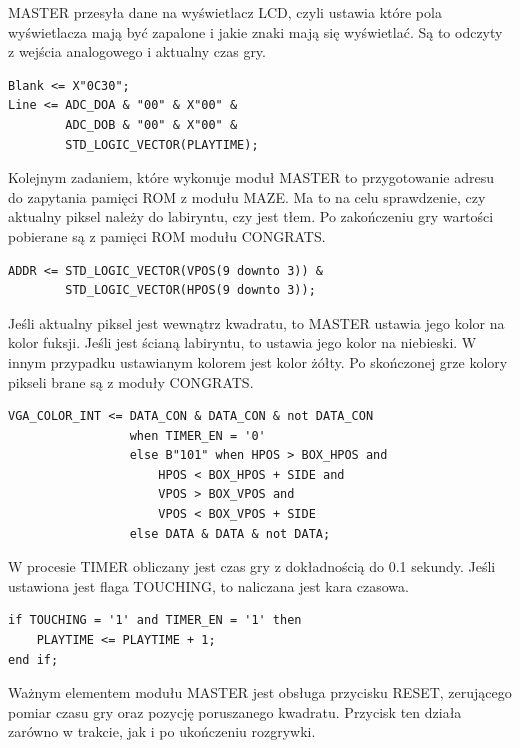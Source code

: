 \documentclass[11pt]{article}
\begin{document}
MASTER przesyła dane na wyświetlacz LCD, czyli ustawia które pola wyświetlacza mają być zapalone i jakie znaki mają się wyświetlać.
Są to odczyty z wejścia analogowego i aktualny czas gry.

\begin{lstlisting}[caption=Sterowanie wyświetlaczem LCD]
Blank <= X"0C30";
Line <= ADC_DOA & "00" & X"00" &
        ADC_DOB & "00" & X"00" &
        STD_LOGIC_VECTOR(PLAYTIME);
\end{lstlisting}	

Kolejnym zadaniem, które wykonuje moduł MASTER to przygotowanie adresu do zapytania pamięci ROM z modułu MAZE.
Ma to na celu sprawdzenie, czy aktualny piksel należy do labiryntu, czy jest tłem.
Po zakończeniu gry wartości pobierane są z pamięci ROM modułu CONGRATS.
\newpage
{}
\begin{lstlisting}[caption=Ustawienie adresu w pamięci ROM]
ADDR <= STD_LOGIC_VECTOR(VPOS(9 downto 3)) &
        STD_LOGIC_VECTOR(HPOS(9 downto 3));
\end{lstlisting}

Jeśli aktualny piksel jest wewnątrz kwadratu, to MASTER ustawia jego kolor na kolor fuksji.
Jeśli jest ścianą labiryntu, to ustawia jego kolor na niebieski.
W innym przypadku ustawianym kolorem jest kolor żółty.
Po skończonej grze kolory pikseli brane są z moduły CONGRATS.

\begin{lstlisting}[caption=Sterowanie kolorem]
VGA_COLOR_INT <= DATA_CON & DATA_CON & not DATA_CON
                 when TIMER_EN = '0'
                 else B"101" when HPOS > BOX_HPOS and
                     HPOS < BOX_HPOS + SIDE and
                     VPOS > BOX_VPOS and
                     VPOS < BOX_VPOS + SIDE
                 else DATA & DATA & not DATA;

\end{lstlisting}

W procesie TIMER obliczany jest czas gry z dokładnością do 0.1 sekundy. 
Jeśli ustawiona jest flaga TOUCHING, to naliczana jest kara czasowa.

\begin{lstlisting}[caption=Naliczanie kary czasowej]
if TOUCHING = '1' and TIMER_EN = '1' then
    PLAYTIME <= PLAYTIME + 1;
end if;
\end{lstlisting}

Ważnym elementem modułu MASTER jest obsługa przycisku RESET, zerującego pomiar czasu gry oraz pozycję poruszanego kwadratu. 
Przycisk ten działa zarówno w trakcie, jak i po ukończeniu rozgrywki. 
\end{document}
